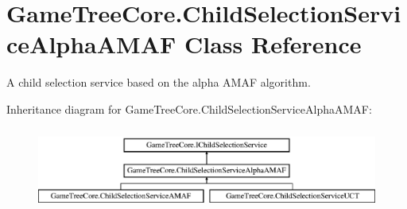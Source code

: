 \hypertarget{class_game_tree_core_1_1_child_selection_service_alpha_a_m_a_f}{}\section{Game\+Tree\+Core.\+Child\+Selection\+Service\+Alpha\+A\+M\+AF Class Reference}
\label{class_game_tree_core_1_1_child_selection_service_alpha_a_m_a_f}


A child selection service based on the alpha A\+M\+AF algorithm.  


Inheritance diagram for Game\+Tree\+Core.\+Child\+Selection\+Service\+Alpha\+A\+M\+AF\+:\begin{figure}[H]
\begin{center}
\leavevmode
\includegraphics[height=2.754098cm]{class_game_tree_core_1_1_child_selection_service_alpha_a_m_a_f}
\end{center}
\end{figure}
